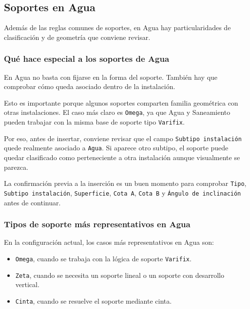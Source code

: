 \subsection{Soportes en Agua}

Además de las reglas comunes de soportes, en Agua hay particularidades de clasificación y de geometría que conviene revisar.

\subsubsection{Qué hace especial a los soportes de Agua}

En Agua no basta con fijarse en la forma del soporte. También hay que comprobar cómo queda asociado dentro de la instalación.

Esto es importante porque algunos soportes comparten familia geométrica con otras instalaciones. El caso más claro es \texttt{Omega}, ya que Agua y Saneamiento pueden trabajar con la misma base de soporte tipo \texttt{Varifix}.

Por eso, antes de insertar, conviene revisar que el campo \texttt{Subtipo instalación} quede realmente asociado a \texttt{Agua}. Si aparece otro subtipo, el soporte puede quedar clasificado como perteneciente a otra instalación aunque visualmente se parezca.

La confirmación previa a la inserción es un buen momento para comprobar \texttt{Tipo}, \texttt{Subtipo instalación}, \texttt{Superficie}, \texttt{Cota A}, \texttt{Cota B} y \texttt{Ángulo de inclinación} antes de continuar.


\subsubsection{Tipos de soporte más representativos en Agua}

En la configuración actual, los casos más representativos en Agua son:

\begin{itemize}
\item \texttt{Omega}, cuando se trabaja con la lógica de soporte \texttt{Varifix}.
\item \texttt{Zeta}, cuando se necesita un soporte lineal o un soporte con desarrollo vertical.
\item \texttt{Cinta}, cuando se resuelve el soporte mediante cinta.
\end{itemize}


